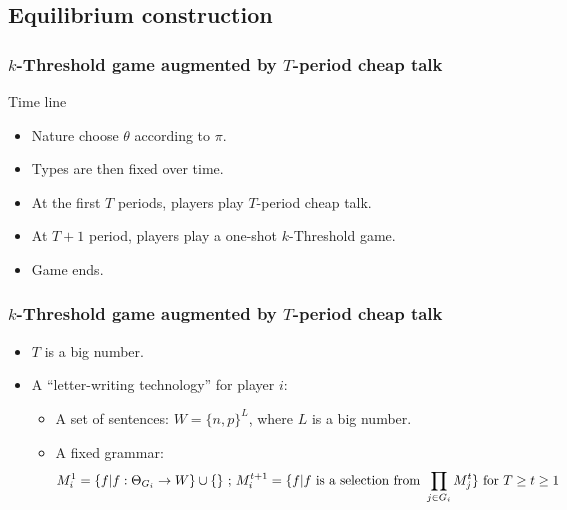 \documentclass[8pt]{beamer}
\begin{document}
\subsection{Equilibrium construction}



\begin{frame}
  \frametitle{$k$-Threshold game augmented by $T$-period cheap talk}

Time line
\begin{itemize}

\item Nature choose $\theta$ according to $\pi$.
\item Types are then fixed over time.
\item At the first $T$ periods, players play $T$-period cheap talk.
\item At $T+1$ period, players play a one-shot $k$-Threshold game.
\item Game ends.
\end{itemize}

\end{frame}






\begin{frame}
  \frametitle{$k$-Threshold game augmented by $T$-period cheap talk}

\begin{itemize}
\item $T$ is a big number.
\item A ``letter-writing technology'' for player $i$:
\begin{itemize}
\item A set of sentences: $W=\{n,p\}^L$, where $L$ is a big number.
\item A fixed grammar: 
\[M^1_i=\{f|f:\Theta_{G_i}\rightarrow W\}\cup\{\empty\} \text{ ; } M^{t+1}_i=\{f|f\text{ is a selection from }\prod_{j\in G_i}M^{t}_j\} \text{ for }T\geq t\geq 1\]
\end{itemize}

\end{itemize}

\end{frame}
\end{document}
